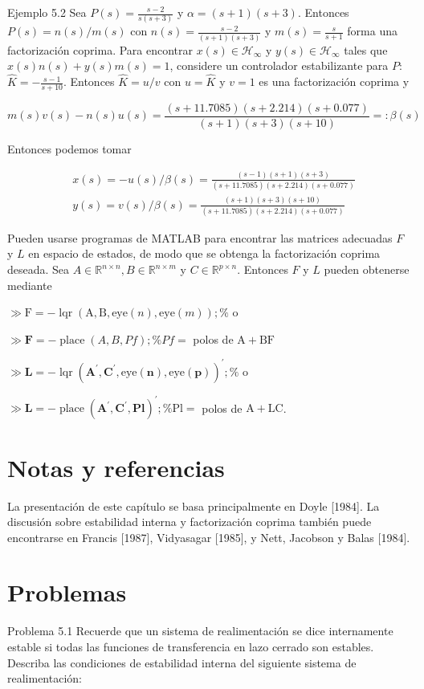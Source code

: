 Ejemplo 5.2 Sea $P(s)=\frac{s-2}{s(s+3)}$ y $\alpha=(s+1)(s+3)$. Entonces $P(s)=n(s) / m(s)$ con $n(s)=\frac{s-2}{(s+1)(s+3)}$ y $m(s)=\frac{s}{s+1}$ forma una factorización coprima. Para encontrar $x(s) \in \mathcal{H}_{\infty}$ y $y(s) \in \mathcal{H}_{\infty}$ tales que $x(s) n(s)+y(s) m(s)=1$, considere un controlador estabilizante para $P$: $\hat{K}=-\frac{s-1}{s+10}$. Entonces $\hat{K}=u / v$ con $u=\hat{K}$ y $v=1$ es una factorización coprima y

$$
m(s) v(s)-n(s) u(s)=\frac{(s+11.7085)(s+2.214)(s+0.077)}{(s+1)(s+3)(s+10)}=: \beta(s)
$$

Entonces podemos tomar

$$
\begin{aligned}
& x(s)=-u(s) / \beta(s)=\frac{(s-1)(s+1)(s+3)}{(s+11.7085)(s+2.214)(s+0.077)} \\
& y(s)=v(s) / \beta(s)=\frac{(s+1)(s+3)(s+10)}{(s+11.7085)(s+2.214)(s+0.077)}
\end{aligned}
$$

Pueden usarse programas de MATLAB para encontrar las matrices adecuadas $F$ y $L$ en espacio de estados, de modo que se obtenga la factorización coprima deseada. Sea $A \in \mathbb{R}^{n \times n}, B \in \mathbb{R}^{n \times m}$ y $C \in \mathbb{R}^{p \times n}$. Entonces $F$ y $L$ pueden obtenerse mediante

$\gg \mathrm{F}=-\operatorname{lqr}(\mathrm{A}, \mathrm{B}, \text{eye}(n), \text{eye}(m)); \%$ o

$\gg \mathbf{F}=-\operatorname{place}(A, B, Pf); \% Pf =$ polos de $\mathrm{A}+\mathrm{BF}$

$\gg \mathbf{L}=-\operatorname{lqr}\left(\mathbf{A}^{\prime}, \mathbf{C}^{\prime}, \text{eye}(\mathbf{n}), \text{eye}(\mathbf{p})\right)^{\prime} ; \%$ o

$\gg \mathbf{L}=-\operatorname{place}\left(\mathbf{A}^{\prime}, \mathbf{C}^{\prime}, \mathbf{Pl}\right)^{\prime} ; \% \mathrm{Pl}=$ polos de $\mathrm{A}+\mathrm{LC}$.

\section{Notas y referencias}
La presentación de este capítulo se basa principalmente en Doyle [1984]. La discusión sobre estabilidad interna y factorización coprima también puede encontrarse en Francis [1987], Vidyasagar [1985], y Nett, Jacobson y Balas [1984].

\section{Problemas}
Problema 5.1 Recuerde que un sistema de realimentación se dice internamente estable si todas las funciones de transferencia en lazo cerrado son estables. Describa las condiciones de estabilidad interna del siguiente sistema de realimentación:

